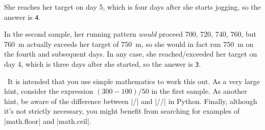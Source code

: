 She reaches her target on day 5, which is four days after she starts jogging, so the
answer is \texttt{4}.

In the second sample, her running pattern \emph{would} proceed 700, 720, 740, 760, but
\SI{760}{\m} actually exceeds her target of \SI{750}{\m}, so she would in fact run
\SI{750}{\m} on the fourth and subsequent days. In any case, she reached/exceeded her
target on day 4, which is three days after she started, so the answer is \texttt{3}.

\Scratch\ It is intended that you use simple mathematics to work this out. As a very large
hint, consider the expression $(300 - 100)/50$ in the first sample. As another hint, be
aware of the difference between \pycode|/| and \pycode|//| in Python. Finally, although
it's not strictly necessary, you might benefit from searching for examples of
\pycode|math.floor| and \pycode|math.ceil|.

